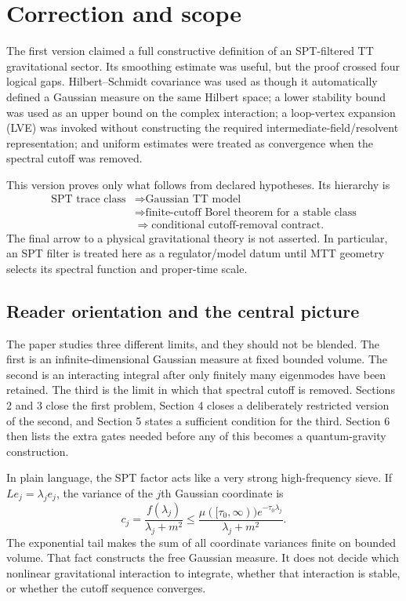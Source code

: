 \documentclass[11pt]{article}
\begin{document}
\tableofcontents

\section{Correction and scope}

The first version claimed a full constructive definition of an SPT-filtered TT
gravitational sector. Its smoothing estimate was useful, but the proof crossed four
logical gaps. Hilbert--Schmidt covariance was used as though it automatically defined
a Gaussian measure on the same Hilbert space; a lower stability bound was used as an
upper bound on the complex interaction; a loop-vertex expansion (LVE) was invoked
without constructing the required intermediate-field/resolvent representation; and
uniform estimates were treated as convergence when the spectral cutoff was removed.

This version proves only what follows from declared hypotheses. Its hierarchy is
\begin{align*}
\boxed{\text{SPT trace class}}
&\Longrightarrow \boxed{\text{Gaussian TT model}}\\
&\Longrightarrow \boxed{\text{finite-cutoff Borel theorem for a stable class}}\\
&\Longrightarrow \boxed{\text{conditional cutoff-removal contract}}.
\end{align*}
The final arrow to a physical gravitational theory is not asserted. In particular,
an SPT filter is treated here as a regulator/model datum until MTT geometry selects
its spectral function and proper-time scale.

\subsection{Reader orientation and the central picture}

The paper studies three different limits, and they should not be blended.  The first
is an infinite-dimensional Gaussian measure at fixed bounded volume.  The second is
an interacting integral after only finitely many eigenmodes have been retained.  The
third is the limit in which that spectral cutoff is removed.  Sections 2 and 3 close
the first problem, Section 4 closes a deliberately restricted version of the second,
and Section 5 states a sufficient condition for the third.  Section 6 then lists the
extra gates needed before any of this becomes a quantum-gravity construction.

In plain language, the SPT factor acts like a very strong high-frequency sieve.  If
$L e_j=\lambda_j e_j$, the variance of the $j$th Gaussian coordinate is
\[
 c_j=\frac{f(\lambda_j)}{\lambda_j+m^2}
 \leq
 \frac{\mu([\tau_0,\infty))e^{-\tau_0\lambda_j}}
      {\lambda_j+m^2}.
\]
The exponential tail makes the sum of all coordinate variances finite on bounded
volume.  That fact constructs the free Gaussian measure.  It does not decide which
nonlinear gravitational interaction to integrate, whether that interaction is stable,
or whether the cutoff sequence converges.
\end{document}
